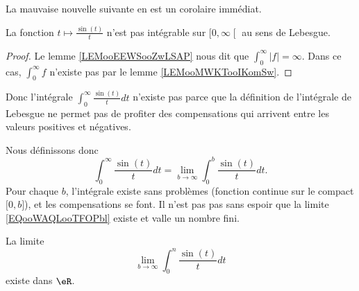 La mauvaise nouvelle suivante en est un corolaire immédiat.
\begin{lemma}
    La fonction \( t\mapsto \frac{ \sin(t) }{ t }\) n'est pas intégrable sur \( \mathopen[ 0 , \infty \mathclose[\) au sens de Lebesgue.
\end{lemma}

\begin{proof}
    Le lemme \ref{LEMooEEWSooZwLSAP} nous dit que \( \int_0^{\infty}| f |=\infty\). Dans ce cas, \( \int_0^{\infty}f\) n'existe pas par le lemme \ref{LEMooMWKTooIKomSw}.
\end{proof}

Donc l'intégrale \( \int_0^{\infty}\frac{ \sin(t) }{ t }dt\) n'existe pas parce que la définition de l'intégrale de Lebesgue ne permet pas de profiter des compensations qui arrivent entre les valeurs positives et négatives.

Nous définissons donc
\begin{equation}        \label{EQooWAQLooTFOPbl}
    \int_0^{\infty}\frac{ \sin(t) }{ t }dt=\lim_{b\to \infty} \int_0^b\frac{ \sin(t) }{ t }dt.
\end{equation}
Pour chaque \( b\), l'intégrale existe sans problèmes (fonction continue sur le compact \( \mathopen[ 0 , b \mathclose]\)), et les compensations se font. Il n'est pas pas sans espoir que la limite \eqref{EQooWAQLooTFOPbl} existe et valle un nombre fini.

\begin{lemma}
    La limite
    \begin{equation}
        \lim_{b\to \infty}\int_0^n\frac{ \sin(t) }{ t }dt
    \end{equation}
    existe dans \( \eR\).
\end{lemma}

